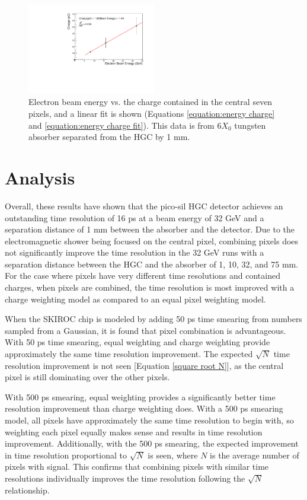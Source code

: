 \documentclass[twocolumn,aps,prd,reprint]{revtex4-1}
\begin{document}
\begin{figure}[!htbp]
\includegraphics[width = 0.5\textwidth]{charge_beam_energy}
\caption{Electron beam energy vs. the charge contained in the central seven pixels, and a linear fit is shown (Equations \ref{equation:energy charge} and \ref{equation:energy charge fit}). This data is from $6X_0$ tungsten absorber separated from the HGC by 1 mm.}
\label{charge beam energy}
\end{figure}

\section{Analysis}

Overall, these results have shown that the pico-sil HGC detector achieves an outstanding time resolution of 16 ps at a beam energy of 32 GeV and a separation distance of 1 mm between the absorber and the detector. Due to the electromagnetic shower being focused on the central pixel, combining pixels does not significantly improve the time resolution in the 32 GeV runs with a separation distance between the HGC and the absorber of 1, 10, 32, and 75 mm. For the case where pixels have very different time resolutions and contained charges, when pixels are combined, the time resolution is most improved with a charge weighting model as compared to an equal pixel weighting model.

When the SKIROC chip is modeled by adding 50 ps time smearing from numbers sampled from a Gaussian, it is found that pixel combination is advantageous. With 50 ps time smearing, equal weighting and charge weighting provide approximately the same time resolution improvement. The expected $\sqrt{N}$ time resolution improvement is not seen [Equation \ref{square root N}], as the central pixel is still dominating over the other pixels.

With 500 ps smearing, equal weighting provides a significantly better time resolution improvement than charge weighting does. With a 500 ps smearing model, all pixels have approximately the same time resolution to begin with, so weighting each pixel equally makes sense and results in time resolution improvement. Additionally, with the 500 ps smearing, the expected improvement in time resolution proportional to $\sqrt{N}$ is seen, where $N$ is the average number of pixels with signal. This confirms that combining pixels with similar time resolutions individually improves the time resolution following the $\sqrt{N}$ relationship.
\end{document}
